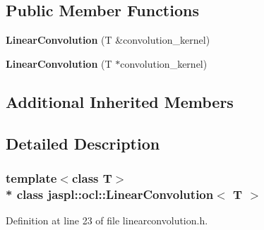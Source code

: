 \subsection*{Public Member Functions}
\begin{DoxyCompactItemize}
\item 
{\bfseries Linear\+Convolution} (T \&convolution\+\_\+kernel)\hypertarget{classjaspl_1_1ocl_1_1_linear_convolution_ace2eaebe26dc0cd81332da88ecb686dd}{}\label{classjaspl_1_1ocl_1_1_linear_convolution_ace2eaebe26dc0cd81332da88ecb686dd}

\item 
{\bfseries Linear\+Convolution} (T $\ast$convolution\+\_\+kernel)\hypertarget{classjaspl_1_1ocl_1_1_linear_convolution_a24010f98b35669374fd0ac03e70a4ee2}{}\label{classjaspl_1_1ocl_1_1_linear_convolution_a24010f98b35669374fd0ac03e70a4ee2}

\end{DoxyCompactItemize}
\subsection*{Additional Inherited Members}


\subsection{Detailed Description}
\subsubsection*{template$<$class T$>$\\*
class jaspl\+::ocl\+::\+Linear\+Convolution$<$ T $>$}



Definition at line 23 of file linearconvolution.\+h.

